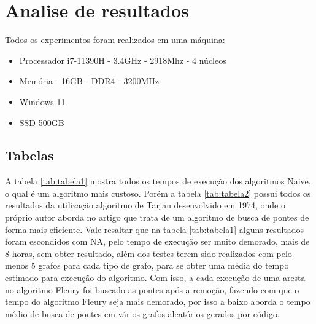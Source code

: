 \newpage
\section{\esp Analise de resultados}

Todos os experimentos foram realizados em uma máquina: 
\begin{itemize}
  \item Processador i7-11390H - 3.4GHz - 2918Mhz - 4 núcleos 
  \item Memória - 16GB - DDR4 - 3200MHz
  \item Windows 11
  \item SSD 500GB
\end{itemize}


\subsection{\esp Tabelas}

A tabela \ref{tab:tabela1} mostra todos os tempos de execução dos algoritmos Naive, o qual é um algoritmo mais custoso. Porém a tabela \ref{tab:tabela2} possui todos os resultados da utilização algoritmo de Tarjan desenvolvido em 1974, onde o próprio autor aborda no artigo \cite{tarjan} que trata de um algoritmo de busca de pontes de forma mais eficiente. Vale resaltar que na tabela \ref{tab:tabela1} alguns resultados foram escondidos com NA, pelo tempo de execução ser muito demorado, mais de 8 horas, sem obter resultado, além dos testes terem sido realizados com pelo menos 5 grafos para cada tipo de grafo, para se obter uma média do tempo estimado para execução do algoritmo. Com isso, a cada execução de uma aresta no algoritmo Fleury foi buscado as pontes após a remoção, fazendo com que o tempo do algoritmo Fleury seja mais demorado, por isso a baixo aborda o tempo médio de busca de pontes em vários grafos aleatórios gerados por código.

